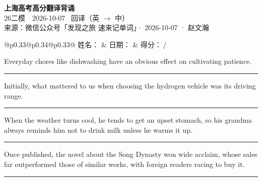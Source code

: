 \documentclass[11pt,a4paper]{article}
\newcommand{\num}[1]{\makebox[1.9em][r]{#1.}\hspace{0.3em}}
\newcommand{\wline}{\noindent\rule{\linewidth}{0.4pt}}
\begin{document}
\pagestyle{plain}
\begin{center}
{\LARGE\bfseries 上海高考高分翻译背诵 }\\[0.25em]
{\large 26二模　2026-10-07 \quad\ 回译（英 $\to$ 中）}\\[0.35em]
{\footnotesize 来源：微信公众号「发现之旅 速来记单词」· 2026-10-07 · 赵文瀚}
\end{center}

\vspace{0.4em}
\noindent\begin{tabular}{@{}p{0.33\textwidth}@{}p{0.34\textwidth}@{}p{0.33\textwidth}@{}}
姓名：\underline{\hspace{2.0cm}} & 日期：\underline{\hspace{2.0cm}} & 得分：\underline{\hspace{1.4cm}}\,/ \\
\end{tabular}

\vspace{0.5em}

\vspace{0.8em}
\num{1}Everyday chores like dishwashing have an obvious effect on cultivating patience.

\vspace{0.25em}

\wline

\num{2}Initially, what mattered to us when choosing the hydrogen vehicle was its driving range.

\vspace{0.25em}

\wline

\num{3}When the weather turns cool, he tends to get an upset stomach, so his grandma always reminds him not to drink milk unless he warms it up.

\vspace{0.25em}

\wline

\num{4}Once published, the novel about the Song Dynasty won wide acclaim, whose sales far outperformed those of similar works, with foreign readers racing to buy it.

\vspace{0.25em}

\wline
\end{document}
